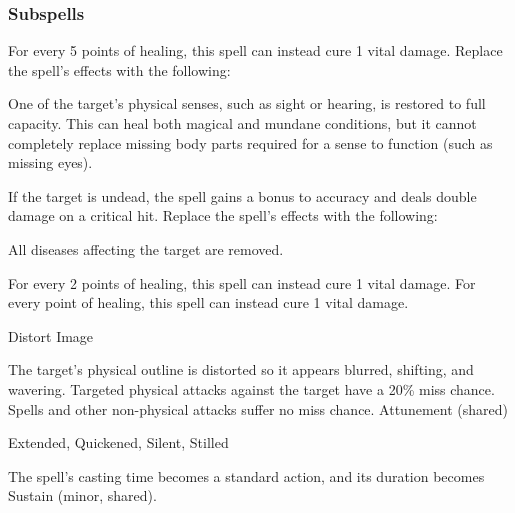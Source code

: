 \subsubsection{Subspells}
For every 5 points of healing, this spell can instead cure 1 vital damage.
Replace the spell's effects with the following:
\begin{spellcontent}
\begin{augmenteffects}
\spelleffect
One of the target's physical senses, such as sight or hearing, is restored to full capacity.
This can heal both magical and mundane conditions, but it cannot completely replace missing body parts required for a sense to function (such as missing eyes).
\end{augmenteffects}
\end{spellcontent}
If the target is undead, the spell gains a  bonus to accuracy and deals double damage on a critical hit.
Replace the spell's effects with the following:
\begin{spellcontent}
\begin{augmenteffects}
\spelleffect
All diseases affecting the target are removed.
\end{augmenteffects}
\end{spellcontent}
For every 2 points of healing, this spell can instead cure 1 vital damage.
For every point of healing, this spell can instead cure 1 vital damage.
\begin{spellsection}{Distort Image}
\begin{spellcontent}
\begin{spelltargetinginfo}
\end{spelltargetinginfo}
\begin{spelleffects}
\spelleffect
The target's physical outline is distorted so it appears blurred, shifting, and wavering.
Targeted physical attacks against the target have a 20\% miss chance.
Spells and other non-physical attacks suffer no miss chance.
\spelldur Attunement (shared)
\end{spelleffects}
\end{spellcontent}
\begin{spellfooter}
 Extended, Quickened, Silent, Stilled
\end{spellfooter}
\begin{spellsubcontent}
\begin{spellcantrip}
The spell's casting time becomes a standard action, and its duration becomes Sustain (minor, shared).
\end{spellcantrip}
\end{spellsubcontent}
\end{spellsection}
